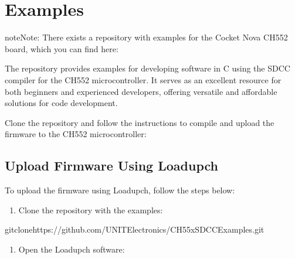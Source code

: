 \documentclass[letterpaper,10pt,english]{sphinxmanual}
\begin{document}
\sphinxstepscope


\chapter{Examples}
\label{\detokenize{examples:examples}}\label{\detokenize{examples::doc}}
\begin{sphinxadmonition}{note}{Note:}
\sphinxAtStartPar
There exists a repository with examples for the Cocket Nova CH552 board, which you can find here:
\begin{quote}


\end{quote}
\end{sphinxadmonition}

\sphinxAtStartPar
The repository provides examples for developing software in C using the SDCC compiler for the CH552 microcontroller. It serves as an excellent resource for both beginners and experienced developers, offering versatile and affordable solutions for code development.

\sphinxAtStartPar
Clone the repository and follow the instructions to compile and upload the firmware to the CH552 microcontroller:
\begin{quote}


\end{quote}


\section{Upload Firmware Using Loadupch}
\label{\detokenize{examples:upload-firmware-using-loadupch}}
\sphinxAtStartPar
To upload the firmware using Loadupch, follow the steps below:
\begin{enumerate}
%
\item {} 
\sphinxAtStartPar
Clone the repository with the examples:

\end{enumerate}

\begin{sphinxVerbatim}[commandchars=\\\{\}]
gitclonehttps://github.com/UNIT\PYGZhy{}Electronics/CH55x\PYGZus{}SDCC\PYGZus{}Examples.git
\end{sphinxVerbatim}
\begin{enumerate}
%
\setcounter{enumi}{1}
\item {} 
\sphinxAtStartPar
Open the Loadupch software:

\end{enumerate}
\end{document}
